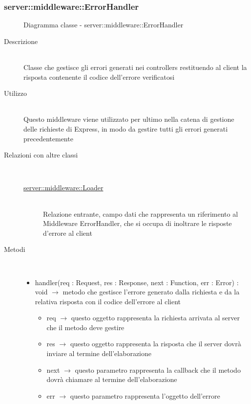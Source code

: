 \subsubsection[ErrorHandler]{server::middleware::ErrorHandler}
\begin{figure}[H]
	\centering
	\caption{Diagramma classe - server::middleware::ErrorHandler}
\end{figure}\begin{description}
\item[Descrizione] \hfill \\
Classe che gestisce gli errori generati nei controllers restituendo al client la risposta contenente il codice dell'errore verificatosi
\item[Utilizzo] \hfill \\
Questo middleware viene utilizzato per ultimo nella catena di gestione delle richieste di Express, in modo da gestire tutti gli errori generati precedentemente
\item[Relazioni con altre classi] \hfill \\
\vspace{-7mm}
\begin{description}
	\item[\hyperlink{server::middleware::Loader}{server::middleware::Loader}] \hfill \\
	Relazione entrante, campo dati che rappresenta un riferimento al Middleware ErrorHandler, che si occupa di inoltrare le risposte d'errore al client
\end{description}

\item[Metodi] \hfill \\
\vspace{-7mm}
\begin{itemize}
	\item handler(req : Request, res : Response, next : Function, err : Error) : void $\rightarrow$ metodo che gestisce l'errore generato dalla richiesta e da la relativa risposta con il codice dell'errore al client\begin{itemize}
		\item req $\rightarrow$ questo oggetto rappresenta la richiesta arrivata al server che il metodo deve gestire	
		\item res $\rightarrow$ questo oggetto rappresenta la risposta che il server dovrà inviare al termine dell'elaborazione	
		\item next $\rightarrow$ questo parametro rappresenta la callback che il metodo dovrà chiamare al termine dell’elaborazione	
		\item err $\rightarrow$ questo parametro rappresenta l'oggetto  dell'errore
	\end{itemize}
	

\end{itemize}
\end{description}
